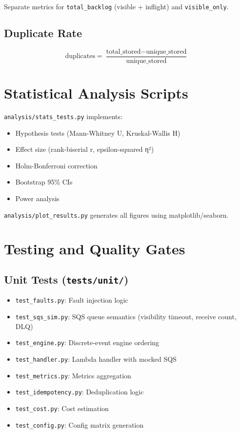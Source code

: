 Separate metrics for \texttt{total\_backlog} (visible + inflight) and \texttt{visible\_only}.

\subsection{Duplicate Rate}

\[
\text{duplicates} = \frac{\text{total\_stored} - \text{unique\_stored}}{\text{unique\_stored}}
\]

\section{Statistical Analysis Scripts}

\texttt{analysis/stats\_tests.py} implements:
\begin{itemize}
    \item Hypothesis tests (Mann-Whitney U, Kruskal-Wallis H)
    \item Effect size (rank-biserial r, epsilon-squared η²)
    \item Holm-Bonferroni correction
    \item Bootstrap 95\% CIs
    \item Power analysis
\end{itemize}

\texttt{analysis/plot\_results.py} generates all figures using matplotlib/seaborn.

\section{Testing and Quality Gates}

\subsection{Unit Tests (\texttt{tests/unit/})}

\begin{itemize}
    \item \texttt{test\_faults.py}: Fault injection logic
    \item \texttt{test\_sqs\_sim.py}: SQS queue semantics (visibility timeout, receive count, DLQ)
    \item \texttt{test\_engine.py}: Discrete-event engine ordering
    \item \texttt{test\_handler.py}: Lambda handler with mocked SQS
    \item \texttt{test\_metrics.py}: Metrics aggregation
    \item \texttt{test\_idempotency.py}: Deduplication logic
    \item \texttt{test\_cost.py}: Cost estimation
    \item \texttt{test\_config.py}: Config matrix generation
\end{itemize}

